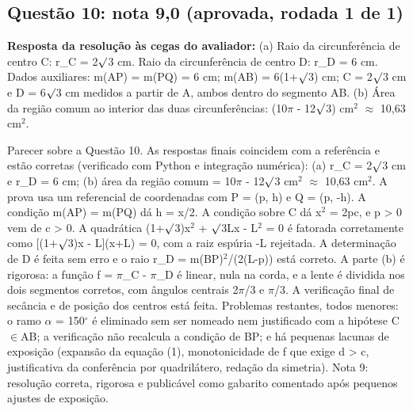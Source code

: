 \documentclass{article}%
\begin{document}
\subsection*{Questão 10: nota 9,0 (aprovada, rodada 1 de 1)}%
\textbf{Resposta da resolução às cegas do avaliador:} (a) Raio da circunferência de centro C: r\_C = 2$\surd$3 cm. Raio da circunferência de centro D: r\_D = 6 cm. Dados auxiliares: m(AP) = m(PQ) = 6 cm; m(AB) = 6(1+$\surd$3) cm; C = 2$\surd$3 cm e D = 6$\surd$3 cm medidos a partir de A, ambos dentro do segmento AB.\newline%
\newline%
(b) Área da região comum ao interior das duas circunferências: (10$\pi$ - 12$\surd$3) cm$^2$ $\approx$ 10,63 cm$^2$.\par %
Parecer sobre a Questão 10. As respostas finais coincidem com a referência e estão corretas (verificado com Python e integração numérica): (a) r\_C = 2$\surd$3 cm e r\_D = 6 cm; (b) área da região comum = 10$\pi$ - 12$\surd$3 cm$^2$ $\approx$ 10,63 cm$^2$. A prova usa um referencial de coordenadas com P = (p, h) e Q = (p, -h). A condição m(AP) = m(PQ) dá h = x/2. A condição sobre C dá x$^2$ = 2pc, e p > 0 vem de c > 0. A quadrática (1+$\surd$3)x$^2$ + $\surd$3Lx - L$^2$ = 0 é fatorada corretamente como {[}(1+$\surd$3)x - L{]}(x+L) = 0, com a raiz espúria -L rejeitada. A determinação de D é feita sem erro e o raio r\_D = m(BP)$^2$/(2(L-p)) está correto. A parte (b) é rigorosa: a função f = $\pi$\_C - $\pi$\_D é linear, nula na corda, e a lente é dividida nos dois segmentos corretos, com ângulos centrais 2$\pi$/3 e $\pi$/3. A verificação final de secância e de posição dos centros está feita. Problemas restantes, todos menores: o ramo $\alpha$ = 150$^\circ$ é eliminado sem ser nomeado nem justificado com a hipótese C$\in$AB; a verificação não recalcula a condição de BP; e há pequenas lacunas de exposição (expansão da equação (1), monotonicidade de f que exige d > c, justificativa da conferência por quadrilátero, redação da simetria). Nota 9: resolução correta, rigorosa e publicável como gabarito comentado após pequenos ajustes de exposição.%
\end{document}
